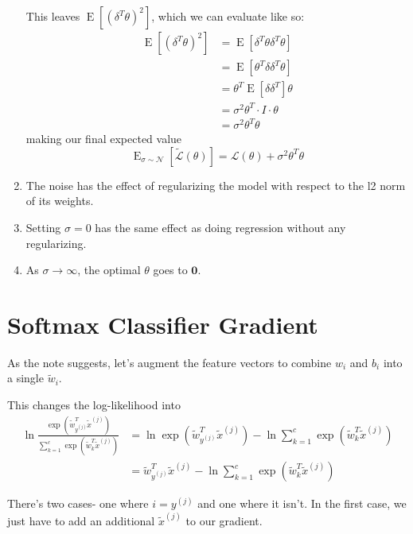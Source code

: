 \documentclass[12pt]{article}
\DeclareMathOperator{\E}{E}
\begin{document}
\begin{enumerate}[label=(\alph*)]
            This leaves $\E\left[\left(\delta^{T}\theta\right)^2\right]$,
            which we can evaluate like so:
            \begin{align*}
                  \E\left[\left(\delta^T\theta\right)^2\right]
                   & = \E\left[\delta^T\theta \delta^T\theta\right]   \\
                   & = \E\left[\theta^T \delta \delta^T \theta\right] \\
                   & = \theta^T \E\left[\delta \delta^T\right] \theta \\
                   & = \sigma^2 \theta^T \cdot I \cdot \theta         \\
                   & = \sigma^2 \theta^T\theta
            \end{align*}
            making our final expected value
            \[\E_{\sigma \sim \mathcal{N}}\left[\tilde{\mathcal{L}}(\theta)\right]=\boxed{\mathcal{L}(\theta)+\sigma^2 \theta^T\theta}\]
      \item The noise has the effect of regularizing the model with respect to the l2 norm of its weights.
      \item Setting $\sigma=0$ has the same effect as doing regression without any regularizing.
      \item As $\sigma \to \infty$, the optimal $\theta$ goes to $\mathbf{0}$.
\end{enumerate}

\pagebreak

\setcounter{section}{2}
\section{Softmax Classifier Gradient}

As the note suggests, let's augment the feature vectors to combine $w_i$ and $b_i$ into a single $\tilde{w}_i$.

This changes the log-likelihood into
\begin{align*}
      \ln \frac{\exp\left(\tilde{w}^T_{y^{(j)}} \tilde{x}^{(j)}\right)}{\sum_{k=1}^{c} \exp\left(\tilde{w}^T_{k} \tilde{x}^{(j)}\right)}
       & = \ln \exp\left(\tilde{w}^T_{y^{(j)}} \tilde{x}^{(j)}\right) - \ln \sum_{k=1}^{c} \exp\left(\tilde{w}^T_{k} \tilde{x}^{(j)}\right) \\
       & = \tilde{w}^T_{y^{(j)}} \tilde{x}^{(j)} - \ln \sum_{k=1}^{c} \exp\left(\tilde{w}^T_{k} \tilde{x}^{(j)}\right)
\end{align*}

There's two cases- one where $i=y^{(j)}$ and one where it isn't.
In the first case, we just have to add an additional $\tilde{x}^{(j)}$ to our gradient.
\end{document}
